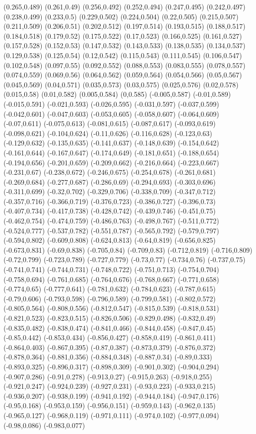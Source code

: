(0.265,0.489) (0.261,0.49) (0.256,0.492) (0.252,0.494) (0.247,0.495) (0.242,0.497) (0.238,0.499) (0.233,0.5) (0.229,0.502) (0.224,0.504) (0.22,0.505) (0.215,0.507) (0.211,0.509) (0.206,0.51) (0.202,0.512) (0.197,0.514) (0.193,0.515) (0.188,0.517) (0.184,0.518) (0.179,0.52) (0.175,0.522) (0.17,0.523) (0.166,0.525) (0.161,0.527) (0.157,0.528) (0.152,0.53) (0.147,0.532) (0.143,0.533) (0.138,0.535) (0.134,0.537) (0.129,0.538) (0.125,0.54) (0.12,0.542) (0.115,0.543) (0.111,0.545) (0.106,0.547) (0.102,0.548) (0.097,0.55) (0.092,0.552) (0.088,0.553) (0.083,0.555) (0.078,0.557) (0.074,0.559) (0.069,0.56) (0.064,0.562) (0.059,0.564) (0.054,0.566) (0.05,0.567) (0.045,0.569) (0.04,0.571) (0.035,0.573) (0.03,0.575) (0.025,0.576) (0.02,0.578) (0.015,0.58) (0.01,0.582) (0.005,0.584) (0,0.585) (-0.005,0.587) (-0.01,0.589) (-0.015,0.591) (-0.021,0.593) (-0.026,0.595) (-0.031,0.597) (-0.037,0.599) (-0.042,0.601) (-0.047,0.603) (-0.053,0.605) (-0.058,0.607) (-0.064,0.609) (-0.07,0.611) (-0.075,0.613) (-0.081,0.615) (-0.087,0.617) (-0.093,0.619) (-0.098,0.621) (-0.104,0.624) (-0.11,0.626) (-0.116,0.628) (-0.123,0.63) (-0.129,0.632) (-0.135,0.635) (-0.141,0.637) (-0.148,0.639) (-0.154,0.642) (-0.161,0.644) (-0.167,0.647) (-0.174,0.649) (-0.181,0.651) (-0.188,0.654) (-0.194,0.656) (-0.201,0.659) (-0.209,0.662) (-0.216,0.664) (-0.223,0.667) (-0.231,0.67) (-0.238,0.672) (-0.246,0.675) (-0.254,0.678) (-0.261,0.681) (-0.269,0.684) (-0.277,0.687) (-0.286,0.69) (-0.294,0.693) (-0.303,0.696) (-0.311,0.699) (-0.32,0.702) (-0.329,0.706) (-0.338,0.709) (-0.347,0.712) (-0.357,0.716) (-0.366,0.719) (-0.376,0.723) (-0.386,0.727) (-0.396,0.73) (-0.407,0.734) (-0.417,0.738) (-0.428,0.742) (-0.439,0.746) (-0.451,0.75) (-0.462,0.754) (-0.474,0.759) (-0.486,0.763) (-0.498,0.767) (-0.511,0.772) (-0.524,0.777) (-0.537,0.782) (-0.551,0.787) (-0.565,0.792) (-0.579,0.797) (-0.594,0.802) (-0.609,0.808) (-0.624,0.813) (-0.64,0.819) (-0.656,0.825) (-0.673,0.831) (-0.69,0.838) (-0.705,0.84) (-0.709,0.83) (-0.712,0.819) (-0.716,0.809) (-0.72,0.799) (-0.723,0.789) (-0.727,0.779) (-0.73,0.77) (-0.734,0.76) (-0.737,0.75) (-0.741,0.741) (-0.744,0.731) (-0.748,0.722) (-0.751,0.713) (-0.754,0.704) (-0.758,0.694) (-0.761,0.685) (-0.764,0.676) (-0.768,0.667) (-0.771,0.658) (-0.774,0.65) (-0.777,0.641) (-0.781,0.632) (-0.784,0.623) (-0.787,0.615) (-0.79,0.606) (-0.793,0.598) (-0.796,0.589) (-0.799,0.581) (-0.802,0.572) (-0.805,0.564) (-0.808,0.556) (-0.812,0.547) (-0.815,0.539) (-0.818,0.531) (-0.821,0.523) (-0.823,0.515) (-0.826,0.506) (-0.829,0.498) (-0.832,0.49) (-0.835,0.482) (-0.838,0.474) (-0.841,0.466) (-0.844,0.458) (-0.847,0.45) (-0.85,0.442) (-0.853,0.434) (-0.856,0.427) (-0.858,0.419) (-0.861,0.411) (-0.864,0.403) (-0.867,0.395) (-0.87,0.387) (-0.873,0.379) (-0.876,0.372) (-0.878,0.364) (-0.881,0.356) (-0.884,0.348) (-0.887,0.34) (-0.89,0.333) (-0.893,0.325) (-0.896,0.317) (-0.898,0.309) (-0.901,0.302) (-0.904,0.294) (-0.907,0.286) (-0.91,0.278) (-0.913,0.27) (-0.915,0.263) (-0.918,0.255) (-0.921,0.247) (-0.924,0.239) (-0.927,0.231) (-0.93,0.223) (-0.933,0.215) (-0.936,0.207) (-0.938,0.199) (-0.941,0.192) (-0.944,0.184) (-0.947,0.176) (-0.95,0.168) (-0.953,0.159) (-0.956,0.151) (-0.959,0.143) (-0.962,0.135) (-0.965,0.127) (-0.968,0.119) (-0.971,0.111) (-0.974,0.102) (-0.977,0.094) (-0.98,0.086) (-0.983,0.077) 
